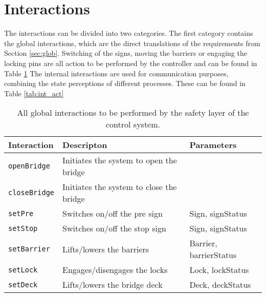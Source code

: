 \section{Interactions}
\label{sec:act}


The interactions can be divided into two categories. The first category contains the global interactions, which are the direct translations of the requirements from Section \ref{sec:glob}.
Switching of the signs, moving the barriers or engaging the locking pins are all action to be performed by the controller and can be found in Table \ref{tab:glob_act}
The internal interactions are used for communication purposes, combining the state perceptions of different processes. These can be found in Table \ref{tab:int_act}
%
\begin{table}[htb]%
\begin{tabular}{lll}
      \textbf{Interaction} &	\textbf{Descripton}	&	\textbf{Parameters}\\
      \hline
      \texttt{openBridge} & Initiates the system to open the bridge &\\
      \texttt{closeBridge} & Initiates the system to close the bridge & \\
      \texttt{setPre} & Switches on/off the pre sign & Sign, signStatus\\
      \texttt{setStop} & Switches on/off the stop sign & Sign, signStatus\\
      \texttt{setBarrier} & Lifts/lowers the barriers & Barrier, barrierStatus\\
      \texttt{setLock} & Engages/disengages the locks & Lock, lockStatus\\
      \texttt{setDeck} & Lifts/lowers the bridge deck & Deck, deckStatus\\
\end{tabular}
\caption{All global interactions to be performed by the safety layer of the control system.}
\label{tab:glob_act}
\end{table}

